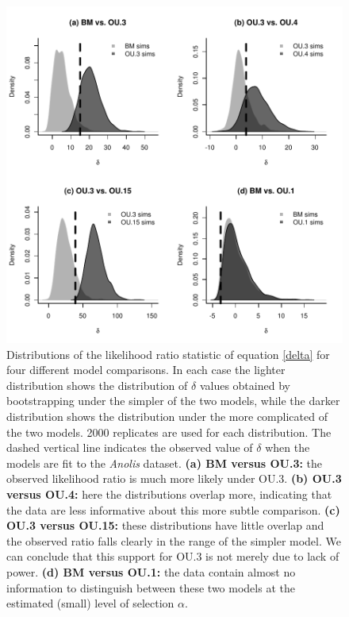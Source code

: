 \begin{figure}
\begin{center}
\includegraphics[width=\textwidth]{../pmc/boettiger_figure4_bw.pdf}
\end{center}
\caption{
Distributions of the likelihood ratio statistic of equation \eqref{delta} for four different model comparisons.
In each case the lighter distribution shows the distribution of $\delta$ values 
obtained by bootstrapping under the simpler of the two models, 
while the darker distribution shows the distribution under the more complicated of the two models.
2000 replicates are used for each distribution.
The dashed vertical line indicates the observed value of $\delta$ when the models are fit to the {\it Anolis} dataset.
{\bf (a) BM versus OU.3:} the observed likelihood ratio is much more likely under OU.3.
{\bf (b) OU.3 versus OU.4:} here the distributions overlap more, indicating that the data are less informative about this more subtle comparison.  
{\bf (c) OU.3 versus OU.15:} these distributions have little overlap and the observed ratio falls clearly in the range of the simpler model. 
We can conclude that this support for OU.3 is not merely due to lack of power.  
{\bf (d) BM versus OU.1:} the data contain almost no information to distinguish between these two models at the estimated (small) level of selection $\alpha$. 
}
\label{fig:pmc}  
\end{figure}

